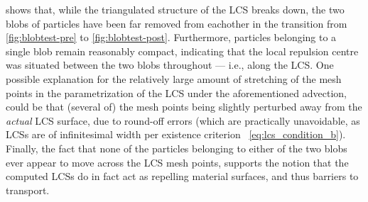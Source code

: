 

 shows that, while the triangulated structure of the LCS
breaks down, the two blobs of particles have been far removed from eachother
in the transition from \cref{fig:blobtest-pre} to \cref{fig:blobtest-post}.
Furthermore, particles belonging to a single blob remain reasonably compact,
indicating that the local repulsion centre was situated between the two
blobs throughout --- i.e., along the LCS. One possible explanation
for the relatively large amount of stretching of the mesh points in the
parametrization of the LCS under the aforementioned advection, could be
that (several of) the mesh points being slightly perturbed away from
the \emph{actual} LCS surface, due to round-off errors (which are practically
unavoidable, as LCSs are of infinitesimal width per existence criterion%
~\eqref{eq:lcs_condition_b}). Finally, the fact that none of the particles
belonging to either of the two blobs ever appear to move across the
LCS mesh points, supports the notion that the computed LCSs do in fact act as
repelling material surfaces, and thus barriers to transport.
